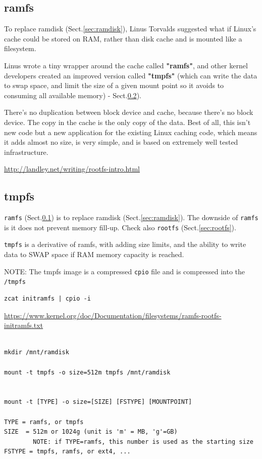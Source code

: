 \subsection{ramfs}
\label{sec:ramfs}


To replace ramdisk (Sect.\ref{sec:ramdisk}), Linus Torvalds suggested what if
Linux's cache could be stored on RAM, rather than disk cache and is mounted like
a filesystem.


Linus wrote a tiny wrapper around the cache called {\bf "ramfs"}, and other
kernel developers created an improved version called {\bf "tmpfs"} (which can
write the data to swap space, and limit the size of a given mount point so it
avoids to consuming all available memory) - Sect.\ref{sec:tmpfs}).

There's no duplication between block device and cache, because there's no block
device. The copy in the cache is the only copy of the data. Best of all, this
isn't new code but a new application for the existing Linux caching code, which
means it adds almost no size, is very simple, and is based on extremely well
tested infrastructure.

\url{http://landley.net/writing/rootfs-intro.html}

  
  

\subsection{tmpfs}
\label{sec:tmpfs}

\verb!ramfs!  (Sect.\ref{sec:ramfs}) is to replace ramdisk
(Sect.\ref{sec:ramdisk}). The downside of \verb!ramfs! is it does not prevent
memory fill-up. Check also \verb!rootfs! (Sect.\ref{sec:rootfs}).

\verb!tmpfs! is a derivative of ramfs, with adding size limits, and the ability
to write data to SWAP space if RAM memory capacity is reached. 


NOTE: The tmpfs image is a compressed \verb!cpio! file and is compressed into
the \verb!/tmpfs!
\begin{verbatim}
zcat initramfs | cpio -i
\end{verbatim}
\url{https://www.kernel.org/doc/Documentation/filesystems/ramfs-rootfs-initramfs.txt}


\begin{verbatim}

mkdir /mnt/ramdisk

mount -t tmpfs -o size=512m tmpfs /mnt/ramdisk


mount -t [TYPE] -o size=[SIZE] [FSTYPE] [MOUNTPOINT]

TYPE = ramfs, or tmpfs
SIZE  = 512m or 1024g (unit is 'm' = MB, 'g'=GB) 
		NOTE: if TYPE=ramfs, this number is used as the starting size
FSTYPE = tmpfs, ramfs, or ext4, ...
\end{verbatim}

